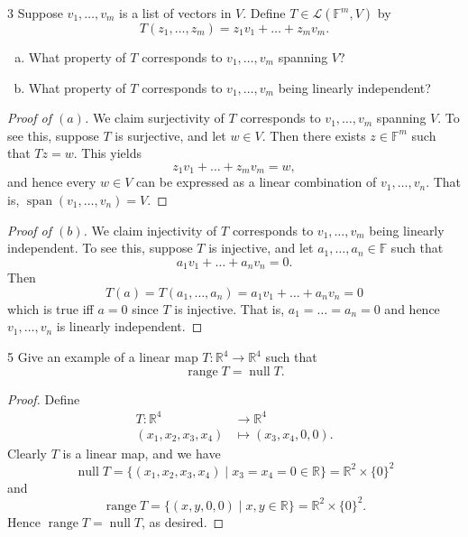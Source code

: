 \documentclass[11pt]{extarticle}
\newenvironment{problem}[1]{\begin{prob*}{#1}{}}{\end{prob*}}
\newcommand{\R}{\mathbb{R}}
\newcommand{\F}{\mathbb{F}}
\DeclareMathOperator{\Span}{span}
\newcommand{\Hom}{\mathcal{L}}
\DeclareMathOperator{\Null}{null}
\DeclareMathOperator{\Range}{range}
\begin{document}
\begin{problem}{3}
Suppose $v_1,\dots,v_m$ is a list of vectors in $V$.  Define $T\in\Hom(\F^m, V)$ by
\begin{equation*}
T(z_1,\dots, z_m) = z_1v_1 + \dots + z_m v_m.
\end{equation*}
\begin{enumerate}[(a)]
\item What property of $T$ corresponds to $v_1,\dots, v_m$ spanning $V$?
\item What property of $T$ corresponds to $v_1,\dots, v_m$ being linearly independent?
\end{enumerate}
\end{problem}
\begin{proof}[Proof of $(a)$]
We claim surjectivity of $T$ corresponds to $v_1,\dots, v_m$ spanning $V$.  To see this, suppose $T$ is surjective, and let $w\in V$.  Then there exists $z\in \F^m$ such that $Tz = w$.  This yields 
\begin{equation*}
z_1v_1 + \dots + z_m v_m = w,
\end{equation*}
and hence every $w\in V$ can be expressed as a linear combination of $v_1,\dots, v_n$.  That is, $\Span(v_1,\dots,v_n)= V$.
\end{proof}
\begin{proof}[Proof of $(b)$]
We claim injectivity of $T$ corresponds to $v_1,\dots, v_m$ being linearly independent.  To see this, suppose $T$ is injective, and let $a_1,\dots, a_n\in\F$ such that 
\begin{equation*}
a_1v_1 + \dots + a_nv_n = 0.
\end{equation*}
Then 
\begin{equation*}
T(a) = T(a_1,\dots, a_n) = a_1v_1 + \dots + a_nv_n = 0
\end{equation*}
which is true iff $a = 0$ since $T$ is injective.  That is, $a_1=\dots = a_n=0$ and hence $v_1,\dots, v_n$ is linearly independent. 
\end{proof}

\begin{problem}{5}
Give an example of a linear map $T:\R^4\to\R^4$ such that 
\begin{equation*}
\Range T = \Null T.
\end{equation*}
\end{problem}
\begin{proof}
Define
\begin{align*}
T: \R^4 &\to \R^4\\
(x_1,x_2,x_3,x_4) &\mapsto (x_3, x_4, 0, 0).
\end{align*}
Clearly $T$ is a linear map, and we have
\begin{equation*}
\Null T =\{(x_1, x_2, x_3, x_4)\mid x_3 = x_4 = 0\in\R\} = \R^2\times \{0\}^2
\end{equation*}
and 
\begin{equation*}
\Range T = \{(x, y, 0, 0)\mid x, y\in\R\} = \R^2 \times \{0\}^2.
\end{equation*}
Hence $\Range T = \Null T$, as desired.
\end{proof}
\end{document}
